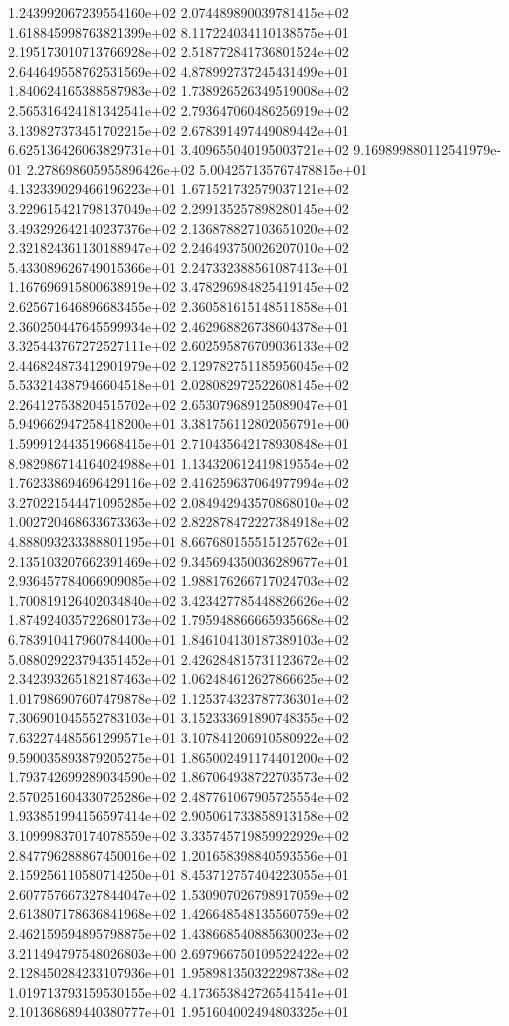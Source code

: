 1.243992067239554160e+02 2.074489890039781415e+02 1.618845998763821399e+02
8.117224034110138575e+01 2.195173010713766928e+02 2.518772841736801524e+02
2.644649558762531569e+02 4.878992737245431499e+01 1.840624165388587983e+02
1.738926526349519008e+02 2.565316424181342541e+02 2.793647060486256919e+02
3.139827373451702215e+02 2.678391497449089442e+01 6.625136426063829731e+01
3.409655040195003721e+02 9.169899880112541979e-01 2.278698605955896426e+02
5.004257135767478815e+01 4.132339029466196223e+01 1.671521732579037121e+02
3.229615421798137049e+02 2.299135257898280145e+02 3.493292642140237376e+02
2.136878827103651020e+02 2.321824361130188947e+02 2.246493750026207010e+02
5.433089626749015366e+01 2.247332388561087413e+01 1.167696915800638919e+02
3.478296984825419145e+02 2.625671646896683455e+02 2.360581615148511858e+01
2.360250447645599934e+02 2.462968826738604378e+01 3.325443767272527111e+02
2.602595876709036133e+02 2.446824873412901979e+02 2.129782751185956045e+02
5.533214387946604518e+01 2.028082972522608145e+02 2.264127538204515702e+02
2.653079689125089047e+01 5.949662947258418200e+01 3.381756112802056791e+00
1.599912443519668415e+01 2.710435642178930848e+01 8.982986714164024988e+01
1.134320612419819554e+02 1.762338694696429116e+02 2.416259637064977994e+02
3.270221544471095285e+02 2.084942943570868010e+02 1.002720468633673363e+02
2.822878472227384918e+02 4.888093233388801195e+01 8.667680155515125762e+01
2.135103207662391469e+02 9.345694350036289677e+01 2.936457784066909085e+02
1.988176266717024703e+02 1.700819126402034840e+02 3.423427785448826626e+02
1.874924035722680173e+02 1.795948866665935668e+02 6.783910417960784400e+01
1.846104130187389103e+02 5.088029223794351452e+01 2.426284815731123672e+02
2.342393265182187463e+02 1.062484612627866625e+02 1.017986907607479878e+02
1.125374323787736301e+02 7.306901045552783103e+01 3.152333691890748355e+02
7.632274485561299571e+01 3.107841206910580922e+02 9.590035893879205275e+01
1.865002491174401200e+02 1.793742699289034590e+02 1.867064938722703573e+02
2.570251604330725286e+02 2.487761067905725554e+02 1.933851994156597414e+02
2.905061733858913158e+02 3.109998370174078559e+02 3.335745719859922929e+02
2.847796288867450016e+02 1.201658398840593556e+01 2.159256110580714250e+01
8.453712757404223055e+01 2.607757667327844047e+02 1.530907026798917059e+02
2.613807178636841968e+02 1.426648548135560759e+02 2.462159594895798875e+02
1.438668540885630023e+02 3.211494797548026803e+00 2.697966750109522422e+02
2.128450284233107936e+01 1.958981350322298738e+02 1.019713793159530155e+02
4.173653842726541541e+01 2.101368689440380777e+01 1.951604002494803325e+01
